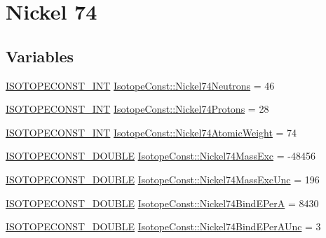 \hypertarget{group___isotope_const-_nickel-_ni74}{}\section{Nickel 74}
\label{group___isotope_const-_nickel-_ni74}
\subsection*{Variables}
\begin{DoxyCompactItemize}
\item 
\mbox{\hyperlink{group___isotope_const-_macros_ga5f18360b3e99483a35c32d789e62621c}{I\+S\+O\+T\+O\+P\+E\+C\+O\+N\+S\+T\+\_\+\+I\+NT}} \mbox{\hyperlink{group___isotope_const-_nickel-_ni74_gae3cc2bb7573ea7a2e013c6108cf2fb49}{Isotope\+Const\+::\+Nickel74\+Neutrons}} = 46
\item 
\mbox{\hyperlink{group___isotope_const-_macros_ga5f18360b3e99483a35c32d789e62621c}{I\+S\+O\+T\+O\+P\+E\+C\+O\+N\+S\+T\+\_\+\+I\+NT}} \mbox{\hyperlink{group___isotope_const-_nickel-_ni74_gaa306636d672384463be8e89789e1e07f}{Isotope\+Const\+::\+Nickel74\+Protons}} = 28
\item 
\mbox{\hyperlink{group___isotope_const-_macros_ga5f18360b3e99483a35c32d789e62621c}{I\+S\+O\+T\+O\+P\+E\+C\+O\+N\+S\+T\+\_\+\+I\+NT}} \mbox{\hyperlink{group___isotope_const-_nickel-_ni74_ga44732d13704e3a133ab1f23a3a9734a9}{Isotope\+Const\+::\+Nickel74\+Atomic\+Weight}} = 74
\item 
\mbox{\hyperlink{group___isotope_const-_macros_ga8f45a7272ce02c0b4c65c44636ed719a}{I\+S\+O\+T\+O\+P\+E\+C\+O\+N\+S\+T\+\_\+\+D\+O\+U\+B\+LE}} \mbox{\hyperlink{group___isotope_const-_nickel-_ni74_ga56af92e276404a6e2bbf886ee0fe6b2e}{Isotope\+Const\+::\+Nickel74\+Mass\+Exc}} = -\/48456
\item 
\mbox{\hyperlink{group___isotope_const-_macros_ga8f45a7272ce02c0b4c65c44636ed719a}{I\+S\+O\+T\+O\+P\+E\+C\+O\+N\+S\+T\+\_\+\+D\+O\+U\+B\+LE}} \mbox{\hyperlink{group___isotope_const-_nickel-_ni74_gabce867ccf35e4100c03dde3dd414601d}{Isotope\+Const\+::\+Nickel74\+Mass\+Exc\+Unc}} = 196
\item 
\mbox{\hyperlink{group___isotope_const-_macros_ga8f45a7272ce02c0b4c65c44636ed719a}{I\+S\+O\+T\+O\+P\+E\+C\+O\+N\+S\+T\+\_\+\+D\+O\+U\+B\+LE}} \mbox{\hyperlink{group___isotope_const-_nickel-_ni74_ga5c9b53c0a5fafeb9fa44ea29411e8c59}{Isotope\+Const\+::\+Nickel74\+Bind\+E\+PerA}} = 8430
\item 
\mbox{\hyperlink{group___isotope_const-_macros_ga8f45a7272ce02c0b4c65c44636ed719a}{I\+S\+O\+T\+O\+P\+E\+C\+O\+N\+S\+T\+\_\+\+D\+O\+U\+B\+LE}} \mbox{\hyperlink{group___isotope_const-_nickel-_ni74_gacd91e7ad1ac15311a4d50345d4d4bb84}{Isotope\+Const\+::\+Nickel74\+Bind\+E\+Per\+A\+Unc}} = 3

\end{DoxyCompactItemize}
